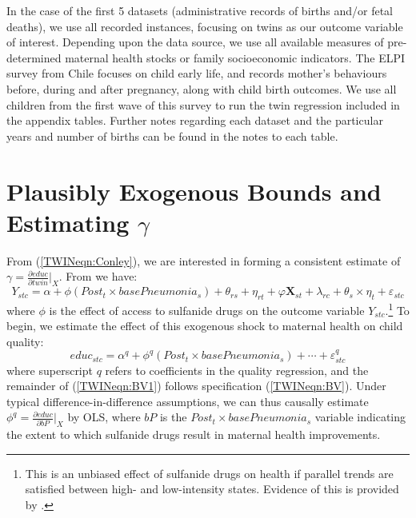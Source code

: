 In the case of the first 5 datasets (administrative records of births and/or 
fetal deaths), we use all recorded instances, focusing on twins as our 
outcome variable of interest.  Depending upon the data source, we use all
available measures of pre-determined maternal health stocks or family 
socioeconomic indicators.  The ELPI survey from Chile focuses on child early
life, and records mother's behaviours before, during and after pregnancy,
along with child birth outcomes.  We use all children from the first wave of
this survey to run the twin regression included in the appendix tables.  
Further notes regarding each dataset and the particular years and number of
births can be found in the notes to each table.

\section{Plausibly Exogenous Bounds and Estimating $\gamma$}
\label{TWINscn:gamma}
From (\ref{TWINeqn:Conley}), we are interested in forming a consistent estimate
of $\gamma=\frac{\partial educ}{\partial twin}\big|_{X}$. From 
\citet{BhalotraVenkataramani2014} we have:
\begin{equation}
\label{TWINeqn:BV}
Y_{stc} = \alpha + \phi (Post_t\times basePneumonia_s) +\theta_{rs} +\eta_{rt}
+\varphi\mathbf{X}_{st}+\lambda_{rc}+\theta_s\times\eta_t+\varepsilon_{stc}
\end{equation}
where $\phi$ is the effect of access to sulfanide drugs on the outcome variable 
$Y_{stc}$.\footnote{This is an unbiased effect of sulfanide drugs on health if
parallel trends are satisfied between high- and low-intensity states. Evidence of
this is provided by \citet{BhalotraVenkataramani2014}.}  To begin, we estimate 
the effect of this exogenous shock to maternal health on child quality:
\begin{equation}
\label{TWINeqn:BV1}
educ_{stc} = \alpha^q + \phi^q (Post_t\times basePneumonia_s) +\cdots+\varepsilon^q_{stc} 
\end{equation}
where superscript $q$ refers to coefficients in the quality regression, and the 
remainder of (\ref{TWINeqn:BV1}) follows specification (\ref{TWINeqn:BV}).  
Under typical difference-in-difference assumptions, we can thus causally 
estimate $\phi^q=\frac{\partial educ}{\partial bP}\big|_{X}$ by OLS, where $bP$ 
is the $Post_t\times basePneumonia_s$ variable indicating the extent to which
sulfanide drugs result in maternal health improvements.

